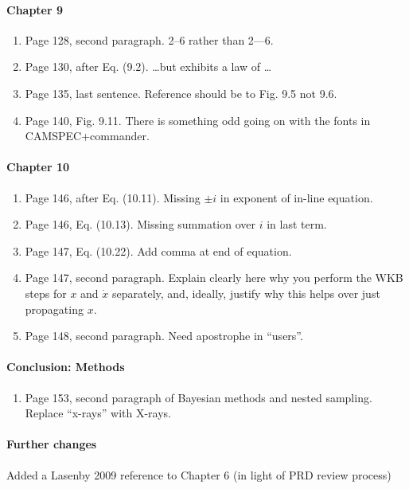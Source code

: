 \documentclass[11pt]{article}
\begin{document}
\paragraph{Chapter 9}
\begin{enumerate}
\item Page 128, second paragraph. 2--6 rather than 2---6.
\item Page 130, after Eq. (9.2). \ldots but exhibits a law of \ldots
\item Page 135, last sentence. Reference should be to Fig. 9.5 not
  9.6.
\item Page 140, Fig. 9.11. There is something odd going on with the
  fonts in CAMSPEC+commander.
\end{enumerate}

\paragraph{Chapter 10}
\begin{enumerate}
\item Page 146, after Eq. (10.11). Missing $\pm i$ in exponent of
  in-line equation.
\item Page 146, Eq. (10.13). Missing summation over $i$ in last term.
\item Page 147, Eq. (10.22). Add comma at end of equation.
\item Page 147, second paragraph. Explain clearly here why you perform
  the WKB steps for $x$ and $\dot{x}$ separately, and, ideally,
  justify why this helps over just propagating $x$.
\item Page 148, second paragraph. Need apostrophe in ``users''.
\end{enumerate}

\paragraph{Conclusion: Methods}
\begin{enumerate}
\item Page 153, second paragraph of Bayesian methods and nested
  sampling. Replace ``x-rays'' with X-rays.
\end{enumerate}



\paragraph{Further changes}
Added a Lasenby 2009 reference to Chapter 6 (in light of PRD review process)
\end{document}
